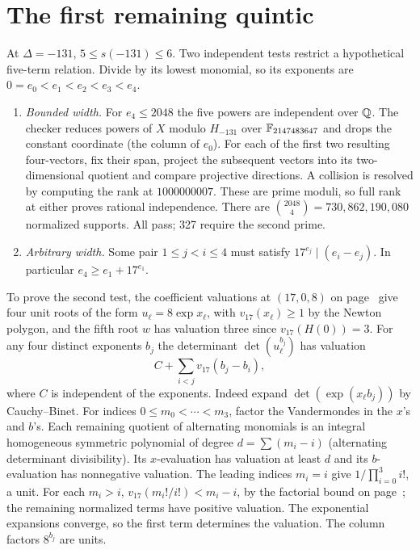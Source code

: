 \section{The first remaining quintic}
At $\Delta=-131$, $5\le s(-131)\le6$. Two independent tests restrict a hypothetical five-term relation. Divide by its lowest monomial, so its exponents are $0=e_0<e_1<e_2<e_3<e_4$.
\begin{enumerate}\setlength{\itemsep}{.15em}
\item \emph{Bounded width.} For $e_4\le2048$ the five powers are independent over $\mathbb Q$. The checker reduces powers of $X$ modulo $H_{-131}$ over $\mathbb F_{2147483647}$ and drops the constant coordinate (the column of $e_0$). For each of the first two resulting four-vectors, fix their span, project the subsequent vectors into its two-dimensional quotient and compare projective directions. A collision is resolved by computing the rank at $1000000007$. These are prime moduli, so full rank at either proves rational independence. There are $\binom{2048}{4}=730{,}862{,}190{,}080$ normalized supports. All pass; 327 require the second prime.
\item \emph{Arbitrary width.} Some pair $1\le j<i\le4$ must satisfy $17^{e_j}\mid(e_i-e_j)$. In particular $e_4\ge e_1+17^{e_1}$.
\end{enumerate}
To prove the second test, the coefficient valuations at $(17,0,8)$ on page~\pageref{sec:cert} give four unit roots of the form $u_\ell=8\exp x_\ell$, with $v_{17}(x_\ell)\ge1$ by the Newton polygon, and the fifth root $w$ has valuation three since $v_{17}(H(0))=3$. For any four distinct exponents $b_j$ the determinant $\det(u_\ell^{b_j})$ has valuation
\[
 C+\sum_{i<j}v_{17}(b_j-b_i),
\]
where $C$ is independent of the exponents. Indeed expand $\det(\exp(x_\ell b_j))$ by Cauchy--Binet. For indices $0\le m_0<\cdots<m_3$, factor the Vandermondes in the $x$'s and $b$'s. Each remaining quotient of alternating monomials is an integral homogeneous symmetric polynomial of degree $d=\sum(m_i-i)$ (alternating determinant divisibility). Its $x$-evaluation has valuation at least $d$ and its $b$-evaluation has nonnegative valuation. The leading indices $m_i=i$ give $1/\prod_{i=0}^3i!$, a unit. For each $m_i>i$, $v_{17}(m_i!/i!)<m_i-i$, by the factorial bound on page~\pageref{lem:disk}; the remaining normalized terms have positive valuation. The exponential expansions converge, so the first term determines the valuation. The column factors $8^{b_j}$ are units.


